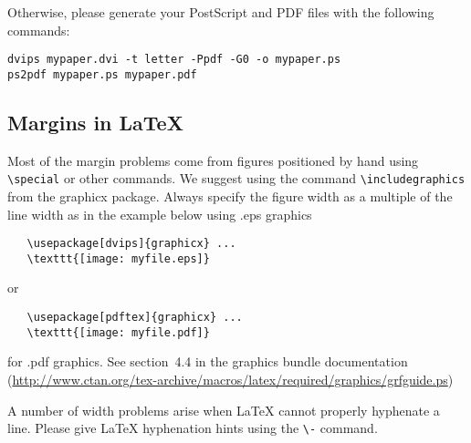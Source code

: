 \documentclass{article}
\begin{document}
Otherwise, please generate your PostScript and PDF files with the following commands:
\begin{verbatim}
dvips mypaper.dvi -t letter -Ppdf -G0 -o mypaper.ps
ps2pdf mypaper.ps mypaper.pdf
\end{verbatim}

\subsection*{Margins in LaTeX}

Most of the margin problems come from figures positioned by hand using
\verb+\special+ or other commands. We suggest using the command
\verb+\includegraphics+
from the graphicx package. Always specify the figure width as a multiple of
the line width as in the example below using .eps graphics
\begin{verbatim}
   \usepackage[dvips]{graphicx} ...
   \texttt{[image: myfile.eps]}
\end{verbatim}
or %
\begin{verbatim}
   \usepackage[pdftex]{graphicx} ...
   \texttt{[image: myfile.pdf]}
\end{verbatim}
for .pdf graphics.
See section~4.4 in the graphics bundle documentation (\url{http://www.ctan.org/tex-archive/macros/latex/required/graphics/grfguide.ps})

A number of width problems arise when LaTeX cannot properly hyphenate a
line. Please give LaTeX hyphenation hints using the \verb+\-+ command.




%



\end{document}
